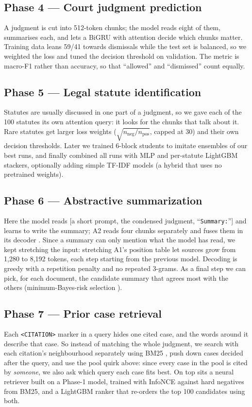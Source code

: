 \documentclass[11pt, oneside]{article}
\newcommand{\code}[1]{\texttt{\small #1}}
\begin{document}
\subsection{Phase 4 --- Court judgment prediction}
A judgment is cut into 512-token chunks; the model reads eight of them, summarises each, and lets a BiGRU with
attention \cite{yang2016han} decide which chunks matter.  Training data leans 59/41 towards dismissals while the
test set is balanced, so we weighted the loss and tuned the decision threshold on validation.  The metric is
macro-F1 rather than accuracy, so that ``allowed'' and ``dismissed'' count equally.

\subsection{Phase 5 --- Legal statute identification}
Statutes are usually discussed in one part of a judgment, so we gave each of the 100 statutes its own
attention query: it looks for the chunks that talk about it.  Rare statutes get larger loss weights
($\sqrt{n_\text{neg}/n_\text{pos}}$, capped at 30) and their own decision thresholds.  Later we trained
6-block students to imitate ensembles of our best runs, and finally combined all runs with MLP and per-statute
LightGBM \cite{ke2017lightgbm} stackers, optionally adding simple TF-IDF models (a hybrid that uses no
pretrained weights).

\subsection{Phase 6 --- Abstractive summarization}
Here the model reads [a short prompt, the condensed judgment, ``\texttt{Summary:}''] and learns to write the
summary; A2 reads four chunks separately and fuses them in its decoder \cite{izacard2021fid}.  Since a summary
can only mention what the model has read, we kept stretching the input: stretching A1's position table
\cite{chen2023pi} let sources grow from 1,280 to 8,192 tokens, each step starting from the previous model.
Decoding is greedy with a repetition penalty and no repeated 3-grams.  As a final step we can pick, for each
document, the candidate summary that agrees most with the others (minimum-Bayes-risk selection
\cite{kumar2004mbr}).

\subsection{Phase 7 --- Prior case retrieval}
Each \code{<CITATION>} marker in a query hides one cited case, and the words around it describe that case.
So instead of matching the whole judgment, we search with each citation's neighbourhood separately using
BM25 \cite{robertson2009bm25}, push down cases decided after the query, and use the pool quirk above: since
every case in the pool is cited by \emph{someone}, we also ask which query each case fits best.  On top sits a
neural retriever built on a Phase-1 model, trained with InfoNCE \cite{oord2018cpc} against hard negatives
from BM25, and a LightGBM ranker that re-orders the top 100 candidates using both.
\end{document}
